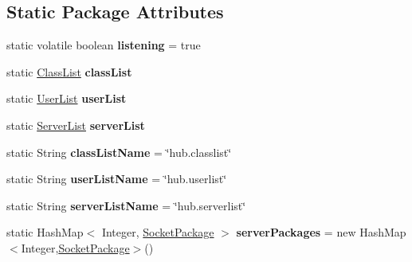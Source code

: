 \subsection*{\-Static \-Package \-Attributes}
\begin{DoxyCompactItemize}
\item 
\hypertarget{classhub_1_1_hub_a4f1b2f3b552c682fa98ea7f6aeed60bf}{
static volatile boolean {\bfseries listening} = true}
\label{classhub_1_1_hub_a4f1b2f3b552c682fa98ea7f6aeed60bf}

\item 
\hypertarget{classhub_1_1_hub_ae26e213fc8836aa9ca73065353f44d19}{
static \hyperlink{classstorage_1_1_class_list}{\-Class\-List} {\bfseries class\-List}}
\label{classhub_1_1_hub_ae26e213fc8836aa9ca73065353f44d19}

\item 
\hypertarget{classhub_1_1_hub_a7be0d4faafad9baf23269a8ae65fab73}{
static \hyperlink{classstorage_1_1_user_list}{\-User\-List} {\bfseries user\-List}}
\label{classhub_1_1_hub_a7be0d4faafad9baf23269a8ae65fab73}

\item 
\hypertarget{classhub_1_1_hub_a09ff3c88e01526ef21829b2becc806af}{
static \hyperlink{classstorage_1_1_server_list}{\-Server\-List} {\bfseries server\-List}}
\label{classhub_1_1_hub_a09ff3c88e01526ef21829b2becc806af}

\item 
\hypertarget{classhub_1_1_hub_a4fbed8def3441e40a0309631d2e97b34}{
static \-String {\bfseries class\-List\-Name} = \char`\"{}hub.\-classlist\char`\"{}}
\label{classhub_1_1_hub_a4fbed8def3441e40a0309631d2e97b34}

\item 
\hypertarget{classhub_1_1_hub_abff595879ac632ef94012daed5340ac2}{
static \-String {\bfseries user\-List\-Name} = \char`\"{}hub.\-userlist\char`\"{}}
\label{classhub_1_1_hub_abff595879ac632ef94012daed5340ac2}

\item 
\hypertarget{classhub_1_1_hub_aa44f7c1feabe446eaedcb027855477dd}{
static \-String {\bfseries server\-List\-Name} = \char`\"{}hub.\-serverlist\char`\"{}}
\label{classhub_1_1_hub_aa44f7c1feabe446eaedcb027855477dd}

\item 
\hypertarget{classhub_1_1_hub_ab72643e75a88daa8b238cd61075900b7}{
static \-Hash\-Map$<$ \-Integer, \*
\hyperlink{classutil_1_1_socket_package}{\-Socket\-Package} $>$ {\bfseries server\-Packages} = new \-Hash\-Map$<$\-Integer,\hyperlink{classutil_1_1_socket_package}{\-Socket\-Package}$>$()}
\label{classhub_1_1_hub_ab72643e75a88daa8b238cd61075900b7}


\end{DoxyCompactItemize}

